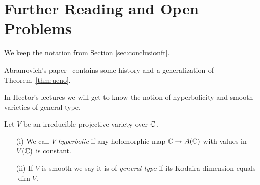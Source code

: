 \section{Further Reading and Open Problems}
We keep the notation from Section \ref{sec:conclusionft}.

Abramovich's paper~\cite{abramovich} contains some history and a
generalization of Theorem~\ref{thm:ueno}.



In Hector's lectures we will get to know the notion of hyperbolicity
and smooth varieties of general type.

\begin{definition}
  Let $V$ be an irreducible projective variety over ${\mathbb{C}}$.
  \begin{enumerate}
  \item [(i)] We call $V$ \emph{hyperbolic} if
    any holomorphic map ${\mathbb{C}} \rightarrow A({\mathbb{C}})$ with values in
    $V({\mathbb{C}})$ is
    constant.
  \item[(ii)] If $V$ is smooth we say it is of \emph{general type} if its
    Kodaira dimension equals $\dim V$. 
  \end{enumerate}
\end{definition}

